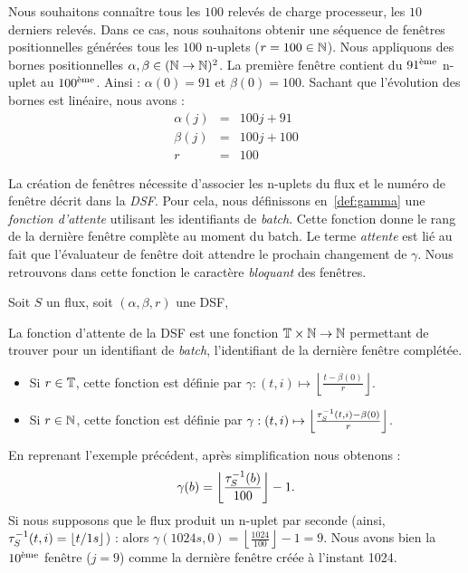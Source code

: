 \begin{example}
    Nous souhaitons connaître tous les $100$ relevés de charge processeur, les $10$ derniers relevés. Dans ce cas, nous souhaitons obtenir une séquence de fenêtres positionnelles générées tous les $100$ n-uplets ($r=100\in \mathbb{N}$). Nous appliquons des bornes positionnelles $\alpha,\beta \in (\mathbb{N}\to\mathbb{N})^2$. La première fenêtre contient du $91^{\textrm{\`{e}me}}$ n-uplet au $100^{\textrm{\`{e}me}}$. Ainsi : $\alpha(0) = 91$ et $\beta(0) = 100$. Sachant que l'évolution des bornes est linéaire, nous avons :
\begin{eqnarray*}
 \alpha(j) &=& 100j+91\\
 \beta(j) &=& 100j + 100\\
 r & = & 100
\end{eqnarray*}
\end{example}

La création de fenêtres nécessite d'associer les n-uplets du flux et le numéro de fenêtre décrit dans la \textit{DSF}. Pour cela, nous définissons en~\ref{def:gamma} une \textit{fonction d'attente} utilisant les identifiants de \textit{batch}. Cette fonction donne le rang de la dernière fenêtre complète au moment du batch. Le terme \textit{attente} est lié au fait que l'évaluateur de fenêtre doit attendre le prochain changement de $\gamma$.
Nous retrouvons dans cette fonction le caractère \textit{bloquant} des fenêtres.
\begin{defi}\label{def:gamma}
    Soit $S$ un flux, soit $(\alpha,\beta,r)$ une DSF,

    La fonction d'attente de la DSF est une fonction $\mathbb{T}\times\mathbb{N} \to \mathbb{N}$ permettant de trouver pour un identifiant de \textit{batch}, l'identifiant de la dernière fenêtre complétée.
\begin{itemize}
 \item  Si $r\in\mathbb{T}$, cette fonction est définie par $\gamma : (t,i) \mapsto \left\lfloor \frac{t-\beta(0)}{r} \right\rfloor$.
 \item  Si $r\in\mathbb{N}$, cette fonction est définie par $\gamma : (t,i) \mapsto \left\lfloor \frac{\tau^{-1}_S(t,i)-\beta(0)}{r} \right\rfloor$.
\end{itemize}
\end{defi}
\begin{example}
    En reprenant l'exemple précédent, après simplification nous obtenons : $$\gamma(b) = \left\lfloor \frac{\tau^{-1}_S(b)}{100}\right\rfloor-1.$$
    Si nous supposons que le flux produit un n-uplet par seconde (ainsi, $\tau^{-1}_S(t,i) = \lfloor t/1s \rfloor$) : alors $\gamma(1024s,0) = \left\lfloor \frac{1024}{100}\right\rfloor-1 = 9$. Nous avons bien la $10^{\textrm{\`{e}me}}$ fenêtre ($j=9$) comme la dernière fenêtre créée à l'instant 1024.
\end{example}

